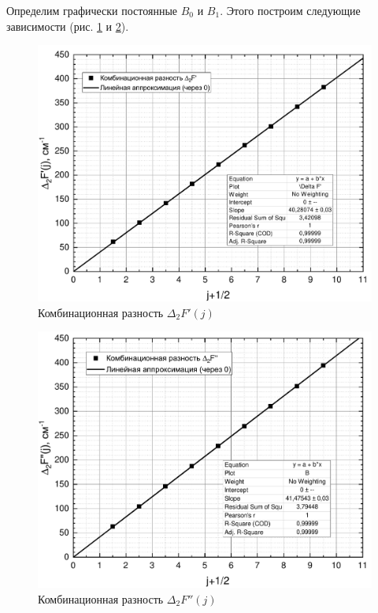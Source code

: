 Определим графически постоянные $B_0$ и $B_1$. Этого построим следующие зависимости (рис. \ref{deltaF'} и \ref{deltaF''}).

\begin{figure}[h!]
	\centering
	\includegraphics[height=0.5\textheight]{data/delta_F'}
	\caption{Комбинационная разность $\Delta_2F'(j)$}
	\label{deltaF'}
\end{figure}
\vspace{2cm}
\begin{figure}[h!]
	\centering
	\includegraphics[height=0.5\textheight]{data/delta_F''}
	\caption{Комбинационная разность $\Delta_2F''(j)$}
	\label{deltaF''}
\end{figure}

